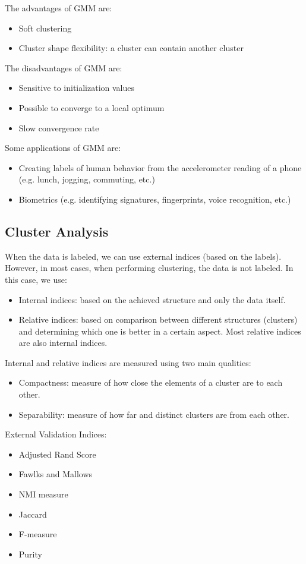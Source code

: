 \documentclass{article}
\begin{document}
The advantages of GMM are:

\begin{itemize}
  \item Soft clustering
  \item Cluster shape flexibility: a cluster can contain another cluster
\end{itemize}

The disadvantages of GMM are:

\begin{itemize}
  \item Sensitive to initialization values
  \item Possible to converge to a local optimum
  \item Slow convergence rate
\end{itemize}

Some applications of GMM are:

\begin{itemize}
  \item Creating labels of human behavior from the accelerometer reading of a phone (e.g. lunch, jogging, commuting, etc.)
  \item Biometrics (e.g. identifying signatures, fingerprints, voice recognition, etc.)
\end{itemize}

\subsection{Cluster Analysis}
When the data is labeled, we can use external indices (based on the labels). However, in most cases, when performing clustering, the data is not labeled. In this case, we use:

\begin{itemize}
  \item Internal indices: based on the achieved structure and only the data itself.
  \item Relative indices: based on comparison between different structures (clusters) and determining which one is better in a certain aspect. Most relative indices are also internal indices.
\end{itemize}

Internal and relative indices are measured using two main qualities:

\begin{itemize}
  \item Compactness: measure of how close the elements of a cluster are to each other.
  \item Separability: measure of how far and distinct clusters are from each other.
\end{itemize}

External Validation Indices:

\begin{itemize}
  \item Adjusted Rand Score
  \item Fawlks and Mallows
  \item NMI measure
  \item Jaccard
  \item F-measure
  \item Purity
\end{itemize}
\end{document}
